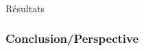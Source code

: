\documentclass[10pt]{beamer}
\begin{document}
    
    \begin{frame}
        \frametitle{}            
    \end{frame}
        
    \begin{section}{Résultats}
    \begin{frame}
    
    \end{frame}
    \end{section}
    
    
    \begin{frame}
        \frametitle{Conclusion/Perspective}
    \end{frame}
    
    \iffalse
    \fi
\end{document}
